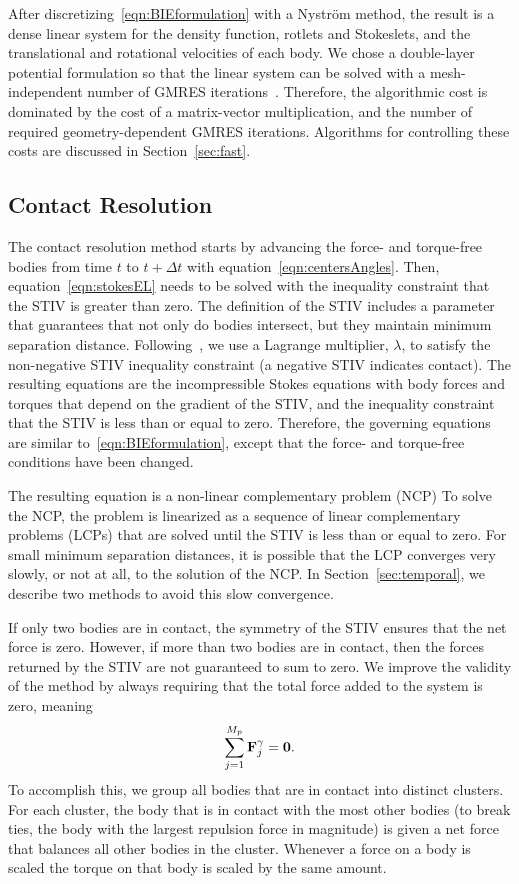 \documentclass[preprint, 10pt]{elsarticle}
\begin{document}
After discretizing~\eqref{eqn:BIEformulation} with a Nystr\"om method,
the result is a dense linear system for the density function, rotlets
and Stokeslets, and the translational and rotational velocities of each
body.  We chose a double-layer potential formulation so that the linear
system can be solved with a mesh-independent number of GMRES
iterations~\cite{Campbell1996}.  Therefore, the algorithmic cost is
dominated by the cost of a matrix-vector multiplication, and the number
of required geometry-dependent GMRES iterations.  Algorithms for
controlling these costs are discussed in Section~\ref{sec:fast}.

\subsection{Contact Resolution}
\label{sec:contact}
The contact resolution method starts by advancing the force- and
torque-free bodies from time $t$ to $t + \Delta t$ with
equation~\eqref{eqn:centersAngles}.  Then, equation~\eqref{eqn:stokesEL}
needs to be solved with the inequality constraint that the STIV is
greater than zero.  The definition of the STIV includes a parameter that
guarantees that not only do bodies intersect, but they maintain minimum
separation distance. Following~\cite{Lu2017}, we use a Lagrange
multiplier, $\lambda$, to satisfy the non-negative STIV inequality
constraint (a negative STIV indicates contact).  The resulting equations
are  the incompressible Stokes equations with body forces and torques
that depend on the gradient of the STIV, and the inequality constraint
that the STIV is less than or equal to zero.  Therefore, the governing
equations are similar to~\eqref{eqn:BIEformulation}, except that the
force- and torque-free conditions have been changed.

The resulting equation is a non-linear complementary problem (NCP) To
solve the NCP, the problem is linearized as a sequence of linear
complementary problems (LCPs) that are solved until the STIV is less
than or equal to zero.  For small minimum separation distances, it is
possible that the LCP converges very slowly, or not at all, to the
solution of the NCP.  In Section~\ref{sec:temporal}, we describe two
methods to avoid this slow convergence.

If only two bodies are in contact, the symmetry of the STIV ensures that
the net force is zero.   However, if more than two bodies are in
contact, then the forces returned by the STIV are not guaranteed to sum
to zero.  We improve the validity of the method by always requiring that
the total force added to the system is zero, meaning
\begin{align*}
  \sum_{j=1}^{M_p} {\mathbf{F}}^\gamma_j = \mathbf{0}. 
\end{align*}
To accomplish this, we group all bodies that are in contact into
distinct clusters.  For each cluster, the body that is in contact with
the most other bodies (to break ties, the body with the largest
repulsion force in magnitude) is given a net force that balances all
other bodies in the cluster. Whenever a force on a body is scaled the
torque on that body is scaled by the same amount.
\end{document}
